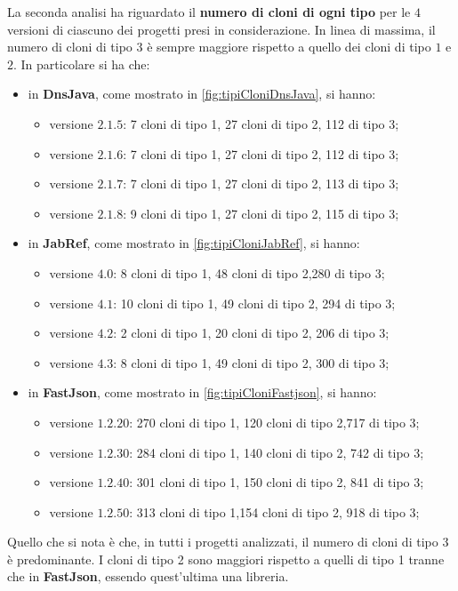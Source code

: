La seconda analisi ha riguardato il \textbf{numero di cloni di ogni tipo} per le $4$ versioni di ciascuno dei progetti presi in considerazione. In linea di massima, il numero di cloni di tipo $3$ è sempre maggiore rispetto a quello dei cloni di tipo $1$ e $2$. In particolare si ha che:
\begin{itemize}
	\item in \textbf{DnsJava}, come mostrato in \autoref{fig:tipiCloniDnsJava}, si hanno:
		\begin{itemize}
				\item versione $2.1.5$: 7 cloni di tipo 1, 27 cloni di tipo 2, 112 di tipo 3;
				\item versione $2.1.6$: 7 cloni di tipo 1, 27 cloni di tipo 2, 112 di tipo 3;
				\item versione $2.1.7$: 7 cloni di tipo 1, 27 cloni di tipo 2, 113 di tipo 3;
				\item versione $2.1.8$: 9 cloni di tipo 1, 27 cloni di tipo 2, 115 di tipo 3;		
		\end{itemize}
	\item in \textbf{JabRef}, come mostrato in \autoref{fig:tipiCloniJabRef}, si hanno:
				\begin{itemize}
			\item versione $4.0$: 8 cloni di tipo 1, 48 cloni di tipo 2,280 di tipo 3;
			\item versione $4.1$: 10 cloni di tipo 1, 49 cloni di tipo 2, 294 di tipo 3;
			\item versione $4.2$: 2 cloni di tipo 1, 20 cloni di tipo 2, 206 di tipo 3;
			\item versione $4.3$: 8 cloni di tipo 1, 49 cloni di tipo 2, 300 di tipo 3;		
		\end{itemize}
	\item in \textbf{FastJson}, come mostrato in \autoref{fig:tipiCloniFastjson}, si hanno:
	\begin{itemize}
		\item versione $1.2.20$: 270 cloni di tipo 1, 120 cloni di tipo 2,717 di tipo 3;
		\item versione $1.2.30$: 284 cloni di tipo 1, 140 cloni di tipo 2, 742 di tipo 3;
		\item versione $1.2.40$: 301 cloni di tipo 1, 150 cloni di tipo 2, 841 di tipo 3;
		\item versione $1.2.50$: 313 cloni di tipo 1,154 cloni di tipo 2, 918 di tipo 3;		
	\end{itemize}
\end{itemize}
Quello che si nota è che, in tutti i progetti analizzati, il numero di cloni di tipo 3 è predominante. I cloni di tipo 2 sono maggiori rispetto a quelli di tipo 1 tranne che in \textbf{FastJson}, essendo quest'ultima una libreria.
